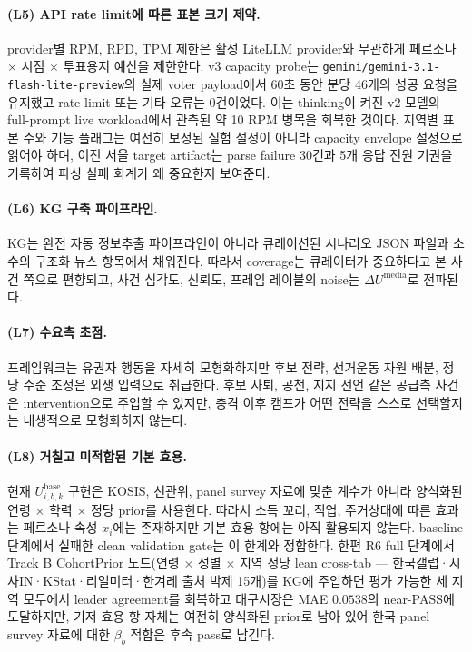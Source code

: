 \documentclass[11pt]{article}
\begin{document}
\paragraph{(L5) API rate limit에 따른 표본 크기 제약.}
provider별 RPM, RPD, TPM 제한은 활성 LiteLLM provider와 무관하게 페르소나 $\times$ 시점 $\times$ 투표용지 예산을 제한한다. v3 capacity probe는 \texttt{gemini/gemini-3.1-flash-lite-preview}의 실제 voter payload에서 60초 동안 분당 46개의 성공 요청을 유지했고 rate-limit 또는 기타 오류는 0건이었다. 이는 thinking이 켜진 v2 모델의 full-prompt live workload에서 관측된 약 10 RPM 병목을 회복한 것이다. 지역별 표본 수와 기능 플래그는 여전히 보정된 실험 설정이 아니라 capacity envelope 설정으로 읽어야 하며, 이전 서울 target artifact는 parse failure 30건과 5개 응답 전원 기권을 기록하여 파싱 실패 회계가 왜 중요한지 보여준다.

\paragraph{(L6) KG 구축 파이프라인.}
KG는 완전 자동 정보추출 파이프라인이 아니라 큐레이션된 시나리오 JSON 파일과 소수의 구조화 뉴스 항목에서 채워진다. 따라서 coverage는 큐레이터가 중요하다고 본 사건 쪽으로 편향되고, 사건 심각도, 신뢰도, 프레임 레이블의 noise는 $\Delta U^{\text{media}}$로 전파된다.

\paragraph{(L7) 수요측 초점.}
프레임워크는 유권자 행동을 자세히 모형화하지만 후보 전략, 선거운동 자원 배분, 정당 수준 조정은 외생 입력으로 취급한다. 후보 사퇴, 공천, 지지 선언 같은 공급측 사건은 intervention으로 주입할 수 있지만, 충격 이후 캠프가 어떤 전략을 스스로 선택할지는 내생적으로 모형화하지 않는다.

\paragraph{(L8) 거칠고 미적합된 기본 효용.}
현재 $U^{\text{base}}_{i,b,k}$ 구현은 KOSIS, 선관위, panel survey 자료에 맞춘 계수가 아니라 양식화된 연령 $\times$ 학력 $\times$ 정당 prior를 사용한다. 따라서 소득 꼬리, 직업, 주거상태에 따른 효과는 페르소나 속성 $x_i$에는 존재하지만 기본 효용 항에는 아직 활용되지 않는다. baseline 단계에서 실패한 clean validation gate는 이 한계와 정합한다. 한편 R6 full 단계에서 Track B CohortPrior 노드(연령 $\times$ 성별 $\times$ 지역 정당 lean cross-tab — 한국갤럽·시사IN·KStat·리얼미터·한겨레 출처 박제 15개)를 KG에 주입하면 평가 가능한 세 지역 모두에서 leader agreement를 회복하고 대구시장은 MAE $0.0538$의 near-PASS에 도달하지만, 기저 효용 항 자체는 여전히 양식화된 prior로 남아 있어 한국 panel survey 자료에 대한 $\beta_b$ 적합은 후속 pass로 남긴다.
\end{document}
